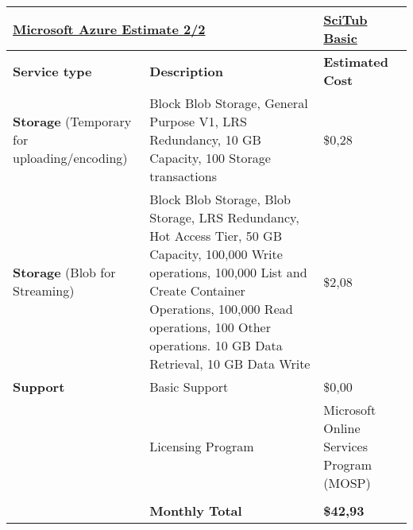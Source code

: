 \begin{adjustbox}{angle=90}
    \begin{tabularx}{\textheight}{|l||X|m{4cm}|}        %
    \hline
    \multicolumn{2}{|l|}{{\ul \textbf{Microsoft Azure Estimate 2/2}}}                     & {\ul \textbf{SciTub Basic}}                          \\ \hline \hline
    \textbf{Service type}            & \textbf{Description}                                                                                                                                                                                                                             & \textbf{Estimated Cost}                  \\ \hline\hline
    \textbf{Storage} (Temporary for uploading/encoding)                     & Block Blob Storage, General Purpose V1, LRS Redundancy, 10 GB Capacity, 100 Storage transactions                                                                                                                                                 & \$0,28                                   \\ \hline
\textbf{Storage} (Blob for Streaming)                           & Block Blob Storage, Blob Storage, LRS Redundancy, Hot Access Tier, 50 GB Capacity, 100,000 Write operations, 100,000 List and Create Container Operations, 100,000 Read operations, 100 Other operations. 10 GB Data Retrieval, 10 GB Data Write & \$2,08                                   \\ \hline
\textbf{Support}                                  & Basic Support                                                                                                                                                                                                                                          & \$0,00                                   \\ \hline
                                                        & Licensing Program                                                                                                                                                                                                                                & Microsoft Online Services Program (MOSP) \\ \hline
            \multicolumn{3}{|l|}{}                \\ \hline\hline
                                                       & \textbf{Monthly Total}                                                                                                                                                                                                                           & \textbf{\$42,93}                         \\ \hline

\end{tabularx}
\end{adjustbox}
